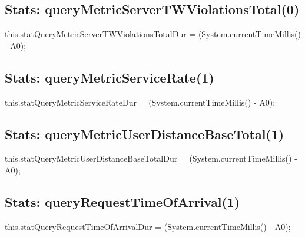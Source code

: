 \subsection{Stats: queryMetricServerTWViolationsTotal(0)}
\nwenddocs{}\endmoddef{}
this.statQueryMetricServerTWViolationsTotalDur = (System.currentTimeMillis() - A0);
\nwendcode{}\nwdocspar

\subsection{Stats: queryMetricServiceRate(1)}
\nwenddocs{}\endmoddef{}
this.statQueryMetricServiceRateDur = (System.currentTimeMillis() - A0);
\nwendcode{}\nwdocspar

\subsection{Stats: queryMetricUserDistanceBaseTotal(1)}
\nwenddocs{}\endmoddef{}
this.statQueryMetricUserDistanceBaseTotalDur = (System.currentTimeMillis() - A0);
\nwendcode{}\nwdocspar

\subsection{Stats: queryRequestTimeOfArrival(1)}
\nwenddocs{}\endmoddef{}
this.statQueryRequestTimeOfArrivalDur = (System.currentTimeMillis() - A0);
\nwendcode{}\nwdocspar

